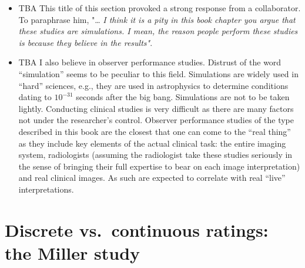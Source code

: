 \documentclass[
]{book}
\begin{document}
\begin{itemize}
\item
  TBA This title of this section provoked a strong response from a collaborator. To paraphrase him, "\ldots{} \emph{I think it is a pity in this book chapter you argue that these studies are simulations. I mean, the reason people perform these studies is because they believe in the results"}.
\item
  TBA I also believe in observer performance studies. Distrust of the word ``simulation'' seems to be peculiar to this field. Simulations are widely used in ``hard'' sciences, e.g., they are used in astrophysics to determine conditions dating to \(10^{-31}\) seconds after the big bang. Simulations are not to be taken lightly. Conducting clinical studies is very difficult as there are many factors not under the researcher's control. Observer performance studies of the type described in this book are the closest that one can come to the ``real thing'' as they include key elements of the actual clinical task: the entire imaging system, radiologists (assuming the radiologist take these studies seriously in the sense of bringing their full expertise to bear on each image interpretation) and real clinical images. As such are expected to correlate with real ``live'' interpretations.
\end{itemize}

\hypertarget{binary-task-discrete-vs-continuous-ratings}{%
\section{Discrete vs.~continuous ratings: the Miller study}\label{binary-task-discrete-vs-continuous-ratings}}
\end{document}
